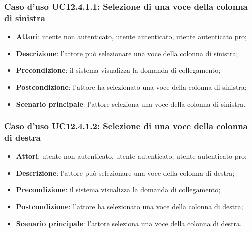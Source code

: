 \subsubsection{Caso d'uso UC12.4.1.1: Selezione di una voce della colonna di sinistra}
\begin{itemize}
\item \textbf{Attori}: utente non autenticato, utente autenticato, utente autenticato pro;
\item \textbf{Descrizione}: l'attore può selezionare una voce della colonna di sinistra;
\item \textbf{Precondizione}: il sistema visualizza la domanda di collegamento;
\item \textbf{Postcondizione}: l'attore ha selezionato una voce della colonna di sinistra;
\item \textbf{Scenario principale}: l'attore seleziona una voce della colonna di sinistra. 
\end{itemize}

\subsubsection{Caso d'uso UC12.4.1.2: Selezione di una voce della colonna di destra}
\begin{itemize}
\item \textbf{Attori}: utente non autenticato, utente autenticato, utente autenticato pro;
\item \textbf{Descrizione}: l'attore può selezionare una voce della colonna di destra;
\item \textbf{Precondizione}: il sistema visualizza la domanda di collegamento;
\item \textbf{Postcondizione}: l'attore ha selezionato una voce della colonna di destra;
\item \textbf{Scenario principale}: l'attore seleziona una voce della colonna di destra. 
\end{itemize}

